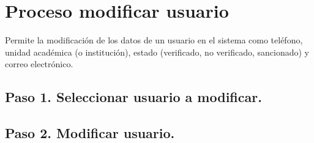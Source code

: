 \chapter{Proceso modificar usuario}
	Permite la modificación de los datos de un usuario en el sistema como teléfono, 
	unidad académica (o institución), estado (verificado, no verificado, 
	sancionado) y correo electrónico.


\section{Paso 1. Seleccionar usuario a modificar.}
	
\section{Paso 2. Modificar usuario.}
	